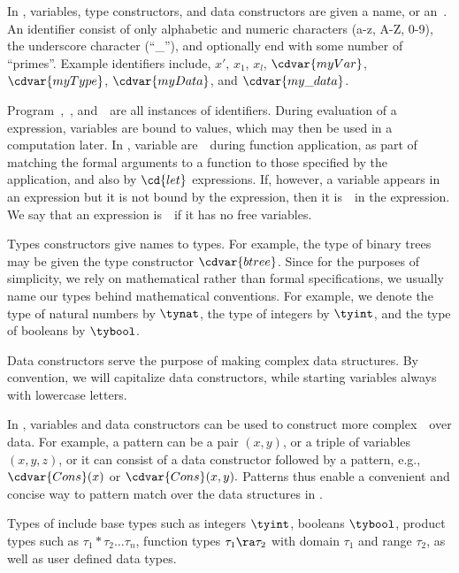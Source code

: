 \begin{gram}[Identifiers]
In \pml, variables, type constructors, and data constructors are given
a name, or an~.  
%
An identifier consist of only alphabetic and numeric characters (a-z,
A-Z, 0-9), the underscore character (``\_''), and optionally end with
some number of ``primes''.  
%
Example identifiers include, $x'$, $x_1$, $x_l$, $\cdvar{myVar}$,
$\cdvar{myType}$, $\cdvar{myData}$, and $\cdvar{my\_data}$.



Program~,~, and~~are all instances of identifiers.
%
During evaluation of a \pml expression, variables are bound to values,
which may then be used in  a computation later.  
%
In \pml, variable are~~during function application, as part
of matching the formal arguments to a function to those specified by
the application, and also by $\cd{let}$ expressions.
%
If, however, a variable appears in an expression but it is not bound
by the expression, then it is~~in the expression.
%
We say that an expression is~~if it
has no free variables.


Types constructors give names to types.  For example, the type of
binary trees may be given the type constructor $\cdvar{btree}$.
%
Since for the purposes of simplicity, we rely on mathematical rather
than formal specifications, we usually name our types behind
mathematical conventions.
%
For example, we denote the type of natural numbers by $\tynat$, the type
of integers by $\tyint$, and the type of booleans by $\tybool$.


Data constructors serve the purpose of making complex data structures.
%
By convention, we will capitalize data constructors, while starting
variables always with lowercase letters.
%
\end{gram}


\begin{gram}[Patterns]
In \pml, variables and data constructors can be used to construct more
complex~~over data.
%
For example, a pattern can be a pair $(x,y)$, or a triple of
variables $(x,y,z)$, or it can consist of a data constructor
followed by a pattern, e.g., $\cdvar{Cons}(x)$ or $\cdvar{Cons}(x,y).$
%
Patterns thus enable a convenient and concise way to pattern match
over the data structures in \pml.
\end{gram}

\begin{gram}
Types of \pml include base types such as integers $\tyint$, booleans
$\tybool$, product types such as $\tau_1 * \tau_2 \ldots \tau_n$,
function types $\tau_1 \ra \tau_2$ with domain $\tau_1$ and range
$\tau_2$, as well as user defined data types.
%
\end{gram}

